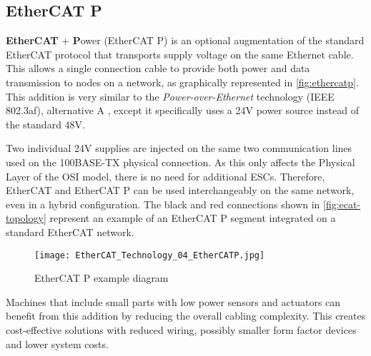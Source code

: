 \subsection{EtherCAT P}

\textbf{EtherCAT} + \textbf Power (EtherCAT P) is an optional augmentation of the standard EtherCAT protocol that transports supply voltage on the same Ethernet cable.
This allows a single connection cable to provide both power and data transmission to nodes on a network, as graphically represented in \autoref{fig:ethercatp}.
This addition is very similar to the \emph{Power-over-Ethernet} technology (IEEE 802.3af), alternative A \cite{technology:poe}, except it specifically uses a 24V power source instead of the standard 48V.

Two individual 24V supplies are injected on the same two communication lines used on the 100BASE-TX \cite{technology:poe} physical connection.
As this only affects the Physical Layer of the OSI model, there is no need for additional ESCs.
Therefore, EtherCAT and EtherCAT P can be used interchangeably on the same network, even in a hybrid configuration.
The black and red connections shown in \autoref{fig:ecat-topology} represent an example of an EtherCAT P segment integrated on a standard EtherCAT network.

\begin{figure}[htp]
	\centering
	\texttt{[image: EtherCAT\_Technology\_04\_EtherCATP.jpg]}
	\caption{EtherCAT P example diagram \cite{protocol:ethercat}}
	\label{fig:ethercatp}
\end{figure}

Machines that include small parts with low power sensors and actuators can benefit from this addition by reducing the overall cabling complexity.
This creates cost-effective solutions with reduced wiring, possibly smaller form factor devices and lower system costs.
